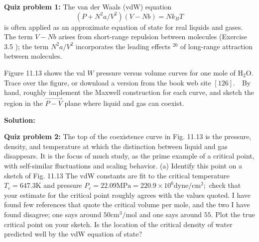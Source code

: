 \documentclass[10pt]{article}
\newenvironment{Solution}
    {\textbf{Solution:}
    
    \vspace{5mm}
    \begin{tcolorbox}
    }
    {
    \end{tcolorbox}
    \vspace{5mm}
    }
\begin{document}
\noindent\textbf{Quiz problem 1:}  The van der Waals (vdW) equation
$$
\left(P+N^{2} a / V^{2}\right)(V-N b)=N k_{B} T
$$
is often applied as an approximate equation of state for real liquids and gases. The term $V-N b$ arises from short-range repulsion between molecules (Exercise 3.5 ); the term $N^{2} a / V^{2}$ incorporates the leading effects $^{20}$ of long-range attraction between molecules.

Figure 11.13 shows the val $W$ pressure versus volume curves for one mole of $\mathrm{H}_{2} \mathrm{O}$. Trace over the figure, or download a version from the book web site $[126] . \quad$By hand, roughly implement the
Maxwell construction for each curve, and sketch
the region in the $\overrightarrow{P-V}$ plane where liquid and gas can coexist.

\begin{Solution}

\end{Solution}

\newpage
\noindent\textbf{Quiz problem 2:} The top of the coexistence curve in Fig. 11.13 is the pressure, density, and temperature at which the distinction between liquid and gas disappears. It is the focus of much study, as the prime example of a critical point, with self-similar fluctuations and scaling behavior.
(a) Identify this point on a sketch of Fig. 11.13 The vdW constants are fit to the critical temperature $T_{c}=647.3 \mathrm{K}$ and pressure $P_{c} = 22.09 \mathrm{MPa}=220.9 \times 10^{6} \mathrm{dyne} / \mathrm{cm}^{2} ;$ check that
your estimate for the critical point roughly agrees with the values quoted. I have found few references that quote the critical volume per mole, and the two I have found disagree; one says around $50 \mathrm{cm}^{3} / \mathrm{mol}$ and one says around $55 .$ Plot the true critical point on your sketch. Is the location of the critical density of water predicted well by the vdW equation of state?
\end{document}
